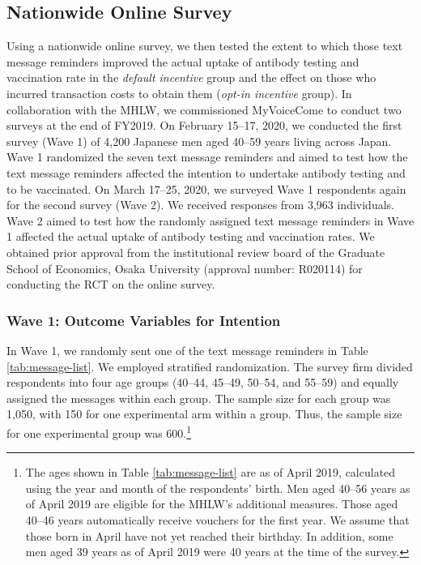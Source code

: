 \documentclass[
  11pt,
  a4paper
]{article}
\begin{document}
\hypertarget{survey}{%
\subsection{Nationwide Online Survey}\label{survey}}

Using a nationwide online survey, we then tested the extent to which those text message reminders improved the actual uptake of antibody testing and vaccination rate in the \emph{default incentive} group and the effect on those who incurred transaction costs to obtain them (\emph{opt-in incentive} group). In collaboration with the MHLW, we commissioned MyVoiceCome to conduct two surveys at the end of FY2019. On February 15--17, 2020, we conducted the first survey (Wave 1) of 4,200 Japanese men aged 40--59 years living across Japan. Wave 1 randomized the seven text message reminders and aimed to test how the text message reminders affected the intention to undertake antibody testing and to be vaccinated. On March 17--25, 2020, we surveyed Wave 1 respondents again for the second survey (Wave 2). We received responses from 3,963 individuals. Wave 2 aimed to test how the randomly assigned text message reminders in Wave 1 affected the actual uptake of antibody testing and vaccination rates. We obtained prior approval from the institutional review board of the Graduate School of Economics, Osaka University (approval number: R020114) for conducting the RCT on the online survey.

\hypertarget{wave1}{%
\subsubsection{Wave 1: Outcome Variables for Intention}\label{wave1}}

In Wave 1, we randomly sent one of the text message reminders in Table \ref{tab:message-list}. We employed stratified randomization. The survey firm divided respondents into four age groups (40--44, 45--49, 50--54, and 55--59) and equally assigned the messages within each group. The sample size for each group was 1,050, with 150 for one experimental arm within a group. Thus, the sample size for one experimental group was 600.\footnote{The ages shown in Table \ref{tab:message-list} are as of April 2019, calculated using the year and month of the respondents' birth. Men aged 40--56 years as of April 2019 are eligible for the MHLW's additional measures. Those aged 40--46 years automatically receive vouchers for the first year. We assume that those born in April have not yet reached their birthday. In addition, some men aged 39 years as of April 2019 were 40 years at the time of the survey.}
\end{document}
